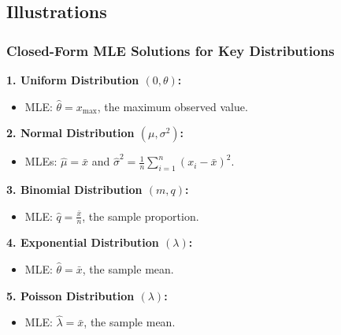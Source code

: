 \documentclass[compress,mathserif]{beamer}
\begin{document}
\subsection{Illustrations}

\begin{frame}
\frametitle{Closed-Form MLE Solutions for Key Distributions}
\textbf{1. Uniform Distribution $(0, \theta)$:}
\begin{itemize}
    \item MLE: $\hat{\theta} = x_{\max}$, the maximum observed value.
\end{itemize}

\textbf{2. Normal Distribution $(\mu, \sigma^2)$:}
\begin{itemize}
    \item MLEs: $\hat{\mu} = \bar{x}$ and $\hat{\sigma}^2 = \frac{1}{n}\sum_{i=1}^{n}(x_i - \bar{x})^2$.
\end{itemize}

\textbf{3. Binomial Distribution $(m, q)$:}
\begin{itemize}
    \item MLE: $\hat{q} = \frac{\bar{x}}{n}$, the sample proportion.
\end{itemize}

\textbf{4. Exponential Distribution $(\lambda)$:}
\begin{itemize}
    \item MLE: $\hat{\theta} = \bar{x}$, the sample mean.
\end{itemize}

\textbf{5. Poisson Distribution $(\lambda)$:}
\begin{itemize}
    \item MLE: $\hat{\lambda} = \bar{x}$, the sample mean.
\end{itemize}

\end{frame}
\end{document}
